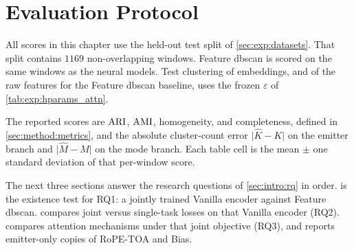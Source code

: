 \section{Evaluation Protocol}\label{sec:exp:protocol}\label{sec:exp:results:protocol}

All scores in this chapter use the held-out test split of \cref{sec:exp:datasets}.
That split contains $1169$ non-overlapping windows.
Feature \gls{dbscan} is scored on the same windows as the neural models.
Test clustering of embeddings, and of the raw features for the Feature \gls{dbscan} baseline, uses the frozen $\varepsilon$ of \cref{tab:exp:hparams_attn}.

The reported scores are $\mathrm{ARI}$, $\mathrm{AMI}$, homogeneity, and completeness, defined in \cref{sec:method:metrics}, and the absolute cluster-count error $\lvert\hat{K}-K\rvert$ on the emitter branch and $\lvert\hat{M}-M\rvert$ on the mode branch.
Each table cell is the mean $\pm$ one standard deviation of that per-window score.

The next three sections answer the research questions of \cref{sec:intro:rq} in order.
 is the existence test for RQ1: a jointly trained Vanilla encoder against Feature \gls{dbscan}.
 compares joint versus single-task losses on that Vanilla encoder (RQ2).
 compares attention mechanisms under that joint objective (RQ3), and reports emitter-only copies of RoPE-TOA and Bias.
